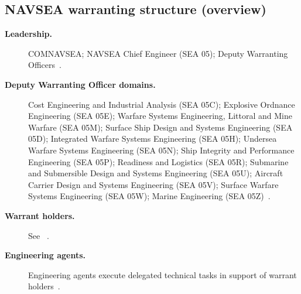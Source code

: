 \documentclass[../main.tex]{subfiles}
\begin{document}
\subsection{NAVSEA warranting structure (overview)}
\begin{description}
  \item[\textbf{Leadership.}] COMNAVSEA; NAVSEA Chief Engineer (SEA 05); Deputy Warranting Officers~\autocite{edo-2-1-5-technical-authority-2025}.
  \item[\textbf{Deputy Warranting Officer domains.}] Cost Engineering and Industrial Analysis (SEA 05C); Explosive Ordnance Engineering (SEA 05E); Warfare Systems Engineering, Littoral and Mine Warfare (SEA 05M); Surface Ship Design and Systems Engineering (SEA 05D); Integrated Warfare Systems Engineering (SEA 05H); Undersea Warfare Systems Engineering (SEA 05N); Ship Integrity and Performance Engineering (SEA 05P); Readiness and Logistics (SEA 05R); Submarine and Submersible Design and Systems Engineering (SEA 05U); Aircraft Carrier Design and Systems Engineering (SEA 05V); Surface Warfare Systems Engineering (SEA 05W); Marine Engineering (SEA 05Z)~\autocite{edo-2-1-5-technical-authority-2025}.
  \item[\textbf{Warrant holders.}] See \Sec{\ref{sec:twhs}}~\autocite{edo-2-1-5-technical-authority-2025}.
  \item[\textbf{Engineering agents.}] Engineering agents execute delegated technical tasks in support of warrant holders~\autocite{edo-2-1-5-technical-authority-2025}.
\end{description}
\end{document}
